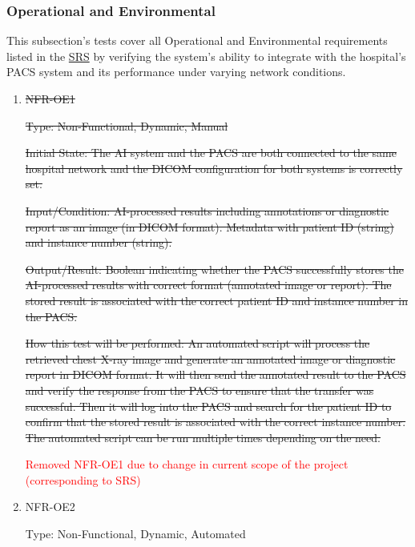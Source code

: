 \documentclass[12pt, titlepage]{article}
\begin{document}
\begin{enumerate}
\begin{enumerate}
\end{enumerate}

\subsubsection{Operational and Environmental}

This subsection's tests cover all Operational and Environmental requirements listed in the \href{https://github.com/RezaJodeiri/CXR-Capstone/blob/main/docs/SRS/SRS.pdf}{SRS} \citep{SRS}
 by verifying the system's ability to integrate with the hospital's PACS system and its performance under varying network conditions.

\begin{enumerate}

\item{\sout{NFR-OE1}}\label{NFR-OE1}

\sout{Type: Non-Functional, Dynamic, Manual}

\sout{Initial State: The AI system and the PACS are both connected to the same hospital network and the DICOM configuration for both systems is correctly set.}

\sout{Input/Condition: AI-processed results including annotations or diagnostic report as an image (in DICOM format). Metadata with patient ID (string) and instance number (string).}

\sout{Output/Result: Boolean indicating whether the PACS successfully stores the AI-processed results with correct format (annotated image or report). The stored result is associated with the correct patient ID and instance number in the PACS.}

\sout{How this test will be performed: An automated script will process the retrieved chest X-ray image and generate an annotated image or diagnostic report in DICOM format. It will then send the annotated result to the PACS and verify the response from the PACS to ensure that the transfer was successful. Then it will log into the PACS and search for the patient ID to confirm that the stored result is associated with the correct instance number. The automated script can be run multiple times depending on the need.}


\textcolor{red}{Removed NFR-OE1 due to change in current scope of the project (corresponding to SRS)}

\item{NFR-OE2}\label{NFR-OE2}

Type: Non-Functional, Dynamic, Automated


\end{enumerate}
\end{enumerate}
\end{document}
